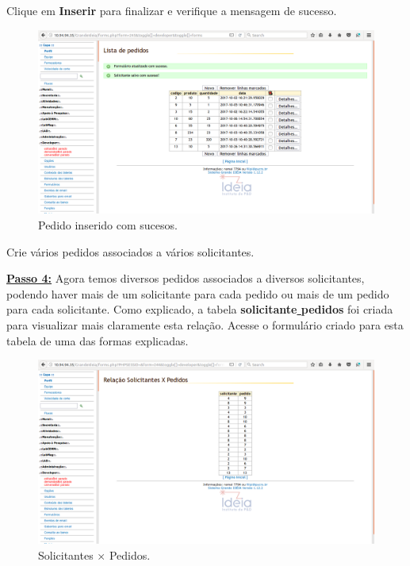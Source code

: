 \documentclass[9pt]{report}
\begin{document}
{       Clique em \textbf{Inserir} para finalizar e verifique a
       mensagem de sucesso.

       \begin{figure}[H]
        \includegraphics[width=\textwidth]{2_Formularios/4_Relacionamento_N_N/49.png}
        \caption{Pedido inserido com sucesos.}
        \label{fig:sucesspedido}
       \end{figure}

       Crie vários pedidos associados a vários solicitantes.

       \underline{\textbf{Passo 4:}} Agora temos diversos pedidos
       associados a diversos solicitantes, podendo haver mais de um
       solicitante para cada pedido ou mais de um pedido para cada
       solicitante. Como explicado, a tabela
       \textbf{solicitante\underline{ }pedidos} foi criada para
       visualizar mais claramente esta relação. Acesse o formulário
       criado para esta tabela de uma das formas explicadas.
       
       \begin{figure}[H]
        \includegraphics[width=\textwidth]{2_Formularios/4_Relacionamento_N_N/50.png}
        \caption{Solicitantes $\times$ Pedidos.}
        \label{fig:solicitpedidos}
       \end{figure}

}
\end{document}

